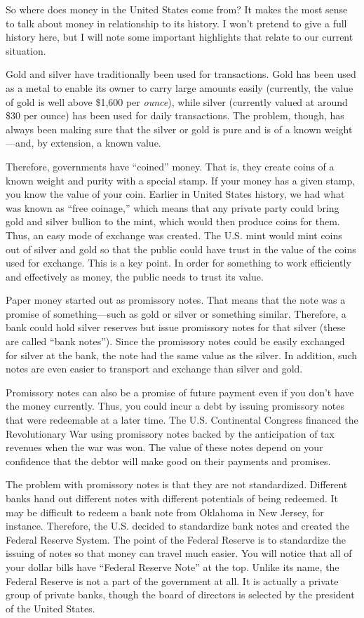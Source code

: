 So where does money in the United States come from?  It makes the most
sense to talk about money in relationship to its history. I won’t
pretend to give a full history here, but I will note some important
highlights that relate to our current situation.  

Gold and silver have traditionally been used for transactions. Gold has
been used as a metal to enable its owner to carry large amounts easily
(currently, the value of gold is well above \$1,600 per
\textit{ounce}), while silver (currently valued at around \$30 per
ounce) has been used for daily transactions. The problem, though, has
always been making sure that the silver or gold is pure and is of a
known weight—and, by extension, a known value. 

Therefore, governments have “coined” money. That is, they create coins
of a known weight and purity with a special stamp. If your money has a
given stamp, you know the value of your coin. Earlier in United States
history, we had what was known as “free coinage,” which means that any
private party could bring gold and silver bullion to the mint, which
would then produce coins for them. Thus, an easy mode of exchange was
created. The U.S. mint would mint coins out of silver and gold so that
the public could have trust in the value of the coins used for
exchange. This is a key point. In order for something to work
efficiently and effectively as money, the public needs to trust its
value.

Paper money started out as promissory notes. That means that the note
was a promise of something—such as gold or silver or something similar.
Therefore, a bank could hold silver reserves but issue promissory notes
for that silver (these are called “bank notes”). Since the promissory
notes could be easily exchanged for silver at the bank, the note had
the same value as the silver.  In addition, such notes are even easier
to transport and exchange than silver and gold.

Promissory notes can also be a promise of future payment even if you
don’t have the money
currently. Thus, you
could incur a debt by issuing promissory notes that were redeemable at
a later time. The U.S. Continental Congress financed the Revolutionary
War using promissory notes backed by the anticipation of tax revenues
when the war was won.  The value of these notes depend on your confidence
that the debtor will make good on their payments and promises.

The problem with promissory notes is that they are not standardized.
Different banks hand out different notes with different potentials of
being redeemed. It may be difficult to redeem a bank note from Oklahoma
in New Jersey, for instance. Therefore, the U.S. decided to standardize
bank notes and created the Federal Reserve System. The point of the
Federal Reserve is to standardize the issuing of notes so that money
can travel much easier. You will notice that all of your dollar bills
have “Federal Reserve Note” at the top.  Unlike its name, the Federal
Reserve is not a part of the government at all.  It is actually a
private group of private banks, though the board of directors is
selected by the president of the United States.

